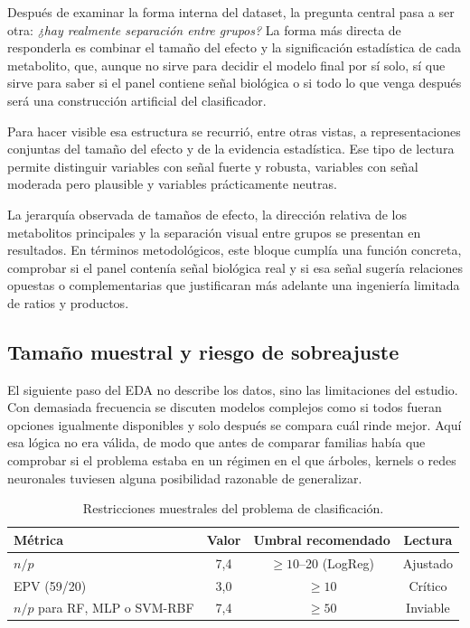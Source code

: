 Después de examinar la forma interna del dataset, la pregunta central pasa a ser otra: \textit{¿hay realmente separación
entre grupos?} La forma más directa de responderla es combinar el tamaño del efecto y la significación estadística de
cada metabolito, que, aunque no sirve para decidir el modelo final por sí solo, sí que sirve para saber si el panel
contiene señal biológica o si todo lo que venga después será una construcción artificial del clasificador.

Para hacer visible esa estructura se recurrió, entre otras vistas, a representaciones conjuntas del tamaño del efecto y
de la evidencia estadística. Ese tipo de lectura permite distinguir variables con señal fuerte y robusta, variables con
señal moderada pero plausible y variables prácticamente neutras.

La jerarquía observada de tamaños de efecto, la dirección relativa de los metabolitos principales y la separación visual
entre grupos se presentan en resultados. En términos metodológicos, este bloque cumplía una función concreta, comprobar
si el panel contenía señal biológica real y si esa señal sugería relaciones opuestas o complementarias que justificaran
más adelante una ingeniería limitada de ratios y productos.

\subsection{Tamaño muestral y riesgo de sobreajuste}\label{sec:epv}

El siguiente paso del EDA no describe los datos, sino las limitaciones del estudio. Con demasiada frecuencia se discuten
modelos complejos como si todos fueran opciones igualmente disponibles y solo después se compara cuál rinde mejor. Aquí
esa lógica no era válida, de modo que antes de comparar familias había que comprobar si el problema estaba en un régimen
en el que árboles, kernels o redes neuronales tuviesen alguna posibilidad razonable de generalizar.

\begin{table}[ht]
\centering
\caption{Restricciones muestrales del problema de clasificación.}
\label{tab:restricciones}
\begin{tabular}{lccc}
\hline
\textbf{Métrica} & \textbf{Valor} & \textbf{Umbral recomendado} & \textbf{Lectura} \\
\hline
$n/p$ & 7,4 & $\geq 10$--20 (LogReg) & Ajustado \\
EPV (59/20) & 3,0 & $\geq 10$ & Crítico \\
$n/p$ para RF, MLP o SVM-RBF & 7,4 & $\geq 50$ & Inviable \\
\hline
\end{tabular}
\end{table}

